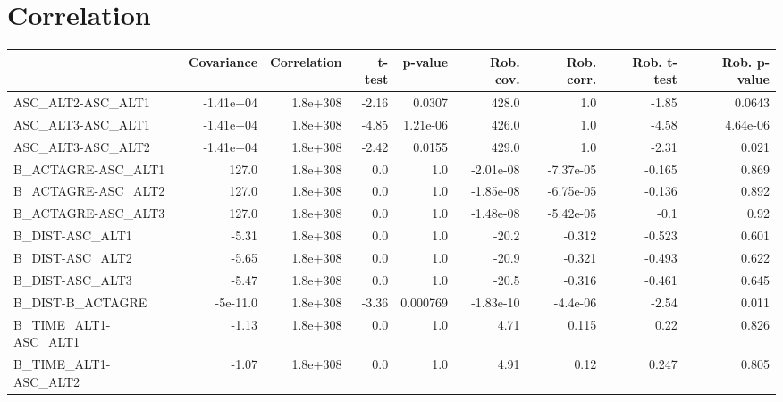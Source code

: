 \section{Correlation}
\begin{tabular}{lrrrrrrrr}
\toprule
{} &  Covariance &  Correlation &  t-test &  p-value &  Rob. cov. &  Rob. corr. &  Rob. t-test &  Rob. p-value \\
\midrule
ASC\_ALT2-ASC\_ALT1                 &   -1.41e+04 &     1.8e+308 &   -2.16 &   0.0307 &      428.0 &         1.0 &        -1.85 &        0.0643 \\
ASC\_ALT3-ASC\_ALT1                 &   -1.41e+04 &     1.8e+308 &   -4.85 & 1.21e-06 &      426.0 &         1.0 &        -4.58 &      4.64e-06 \\
ASC\_ALT3-ASC\_ALT2                 &   -1.41e+04 &     1.8e+308 &   -2.42 &   0.0155 &      429.0 &         1.0 &        -2.31 &         0.021 \\
B\_ACTAGRE-ASC\_ALT1                &       127.0 &     1.8e+308 &     0.0 &      1.0 &  -2.01e-08 &   -7.37e-05 &       -0.165 &         0.869 \\
B\_ACTAGRE-ASC\_ALT2                &       127.0 &     1.8e+308 &     0.0 &      1.0 &  -1.85e-08 &   -6.75e-05 &       -0.136 &         0.892 \\
B\_ACTAGRE-ASC\_ALT3                &       127.0 &     1.8e+308 &     0.0 &      1.0 &  -1.48e-08 &   -5.42e-05 &         -0.1 &          0.92 \\
B\_DIST-ASC\_ALT1                   &       -5.31 &     1.8e+308 &     0.0 &      1.0 &      -20.2 &      -0.312 &       -0.523 &         0.601 \\
B\_DIST-ASC\_ALT2                   &       -5.65 &     1.8e+308 &     0.0 &      1.0 &      -20.9 &      -0.321 &       -0.493 &         0.622 \\
B\_DIST-ASC\_ALT3                   &       -5.47 &     1.8e+308 &     0.0 &      1.0 &      -20.5 &      -0.316 &       -0.461 &         0.645 \\
B\_DIST-B\_ACTAGRE                  &    -5e-11.0 &     1.8e+308 &   -3.36 & 0.000769 &  -1.83e-10 &    -4.4e-06 &        -2.54 &         0.011 \\
B\_TIME\_ALT1-ASC\_ALT1              &       -1.13 &     1.8e+308 &     0.0 &      1.0 &       4.71 &       0.115 &         0.22 &         0.826 \\
B\_TIME\_ALT1-ASC\_ALT2              &       -1.07 &     1.8e+308 &     0.0 &      1.0 &       4.91 &        0.12 &        0.247 &         0.805 \\

\end{tabular}
